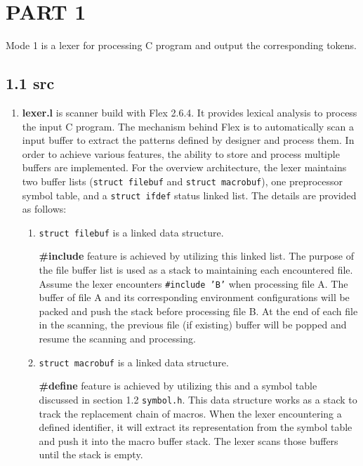 \section*{PART 1}

Mode 1 is a lexer for processing C program and output the corresponding tokens.

\subsection*{1.1 \large\textbf{src}}
\begin{enumerate}
    \item \textbf{lexer.l} is scanner build with Flex 2.6.4. It provides lexical analysis to process the input C program. The mechanism behind Flex is to automatically scan a input buffer to extract the patterns defined by designer and process them. In order to achieve various features, the ability to store and process multiple buffers are implemented. For the overview architecture, the lexer maintains two buffer lists (\texttt{struct filebuf} and \texttt{struct macrobuf}), one preprocessor symbol table, and a \texttt{struct ifdef} status linked list. The details are provided as follows:
    
    \begin{enumerate} 
        \item \texttt{struct filebuf} is a linked data structure.

        \textbf{\#include} feature is achieved by utilizing this linked list. The purpose of the file buffer list is used as a stack to maintaining each encountered file. Assume the lexer encounters \texttt{\#include 'B'} when processing file A. The buffer of file A and its corresponding environment configurations will be packed and push the stack before processing file B. At the end of each file in the scanning, the previous file (if existing) buffer will be popped and resume the scanning and processing.

        \item \texttt{struct macrobuf} is a linked data structure.

        \textbf{\#define} feature is achieved by utilizing this and a symbol table discussed in section 1.2 \texttt{symbol.h}. This data structure works as a stack to track the replacement chain of macros. When the lexer encountering a defined identifier, it will extract its representation from the symbol table and push it into the macro buffer stack. The lexer scans those buffers until the stack is empty. 

    \end{enumerate}
\end{enumerate}

